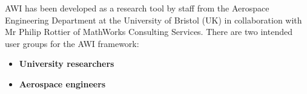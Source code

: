 AWI has been developed as a research tool by staff from the Aerospace Engineering Department at the University of Bristol (UK) in collaboration with Mr Philip Rottier of MathWorks Consulting Services. There are two intended user groups for the AWI framework:

\begin{itemize}
\item \textbf{University researchers}
\item \textbf{Aerospace engineers}
\end{itemize}